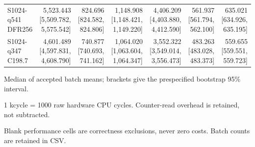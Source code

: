 \begin{table}[t]
{\begin{tabular}{lrrrrrr}
S1024-q541 DFR256 & \shortstack{5,523.443\\{}[5,509.782, 5,575.542]} & \shortstack{824.696\\{}[824.582, 824.806]} & \shortstack{1,148.908\\{}[1,148.421, 1,149.220]} & \shortstack{4,406.209\\{}[4,403.880, 4,412.590]} & \shortstack{561.937\\{}[561.794, 562.100]} & \shortstack{635.021\\{}[634.926, 635.195]} \\
S1024-q347 C198.7 & \shortstack{4,601.489\\{}[4,597.831, 4,608.790]} & \shortstack{740.877\\{}[740.693, 741.162]} & \shortstack{1,064.020\\{}[1,063.604, 1,064.347]} & \shortstack{3,552.322\\{}[3,549.014, 3,556.473]} & \shortstack{483.263\\{}[483.028, 483.373]} & \shortstack{559.655\\{}[559.551, 559.723]} \\
\bottomrule
\end{tabular}}
\begin{minipage}{\textwidth}\footnotesize
Median of accepted batch means; brackets give the prespecified bootstrap 95\% interval.\par
1 kcycle = 1000 raw hardware CPU cycles. Counter-read overhead is retained, not subtracted.\par
Blank performance cells are correctness exclusions, never zero costs. Batch counts are retained in CSV.\par
\end{minipage}
\end{table}
